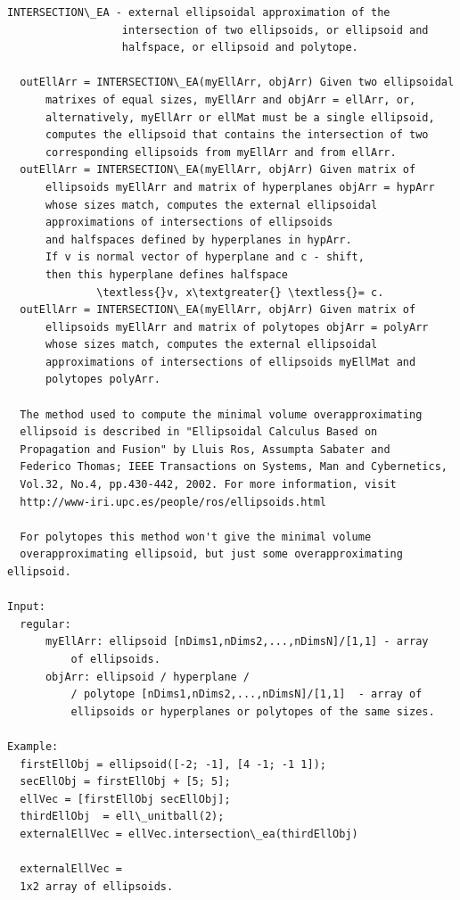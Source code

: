 \documentclass[letterpaper,10pt,english]{sphinxmanual}
\begin{document}
\begin{Verbatim}[commandchars=\\\{\}]
INTERSECTION\_EA - external ellipsoidal approximation of the
                  intersection of two ellipsoids, or ellipsoid and
                  halfspace, or ellipsoid and polytope.

  outEllArr = INTERSECTION\_EA(myEllArr, objArr) Given two ellipsoidal
      matrixes of equal sizes, myEllArr and objArr = ellArr, or,
      alternatively, myEllArr or ellMat must be a single ellipsoid,
      computes the ellipsoid that contains the intersection of two
      corresponding ellipsoids from myEllArr and from ellArr.
  outEllArr = INTERSECTION\_EA(myEllArr, objArr) Given matrix of
      ellipsoids myEllArr and matrix of hyperplanes objArr = hypArr
      whose sizes match, computes the external ellipsoidal
      approximations of intersections of ellipsoids
      and halfspaces defined by hyperplanes in hypArr.
      If v is normal vector of hyperplane and c - shift,
      then this hyperplane defines halfspace
              \textless{}v, x\textgreater{} \textless{}= c.
  outEllArr = INTERSECTION\_EA(myEllArr, objArr) Given matrix of
      ellipsoids myEllArr and matrix of polytopes objArr = polyArr
      whose sizes match, computes the external ellipsoidal
      approximations of intersections of ellipsoids myEllMat and
      polytopes polyArr.

  The method used to compute the minimal volume overapproximating
  ellipsoid is described in "Ellipsoidal Calculus Based on
  Propagation and Fusion" by Lluis Ros, Assumpta Sabater and
  Federico Thomas; IEEE Transactions on Systems, Man and Cybernetics,
  Vol.32, No.4, pp.430-442, 2002. For more information, visit
  http://www-iri.upc.es/people/ros/ellipsoids.html

  For polytopes this method won't give the minimal volume
  overapproximating ellipsoid, but just some overapproximating ellipsoid.

Input:
  regular:
      myEllArr: ellipsoid [nDims1,nDims2,...,nDimsN]/[1,1] - array
          of ellipsoids.
      objArr: ellipsoid / hyperplane /
          / polytope [nDims1,nDims2,...,nDimsN]/[1,1]  - array of
          ellipsoids or hyperplanes or polytopes of the same sizes.

Example:
  firstEllObj = ellipsoid([-2; -1], [4 -1; -1 1]);
  secEllObj = firstEllObj + [5; 5];
  ellVec = [firstEllObj secEllObj];
  thirdEllObj  = ell\_unitball(2);
  externalEllVec = ellVec.intersection\_ea(thirdEllObj)

  externalEllVec =
  1x2 array of ellipsoids.
\end{Verbatim}
\end{document}
